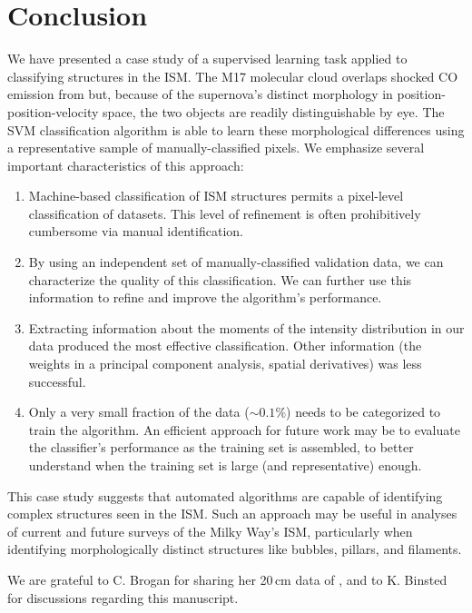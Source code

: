 \section{Conclusion}

We have presented a case study of a supervised learning task applied to classifying structures in the ISM. The M17 molecular cloud overlaps shocked CO emission from \snr{} but, because of the supernova's distinct morphology in position-position-velocity space, the two objects are readily distinguishable by eye. The SVM classification algorithm is able to learn these morphological differences using a representative sample of manually-classified pixels. We emphasize several important characteristics of this approach:

\begin{enumerate}
\item Machine-based classification of ISM structures permits a pixel-level classification of datasets. This level of refinement is often prohibitively cumbersome via manual identification.
\item By using an independent set of manually-classified validation data, we can characterize the quality of this classification. We can further use this information to refine and improve the algorithm's performance.
\item Extracting information about the moments of the intensity distribution in our data produced the most effective classification. Other information (the weights in a principal component analysis, spatial derivatives) was less successful.
\item Only a very small fraction of the data ($\sim0.1\%$) needs to be categorized to train the algorithm. An efficient approach for future work may be to evaluate the classifier's performance as the training set is assembled, to better understand when the training set is large (and representative) enough.
 \end{enumerate}

This case study suggests that automated algorithms are capable of identifying complex structures seen in the ISM. Such an approach may be useful in analyses of current and future surveys of the Milky Way's ISM, particularly when identifying morphologically distinct structures like bubbles, pillars, and filaments.

We are grateful to C. Brogan for sharing her 20\,cm data of \snr{}, and to K. Binsted for discussions regarding this manuscript.


